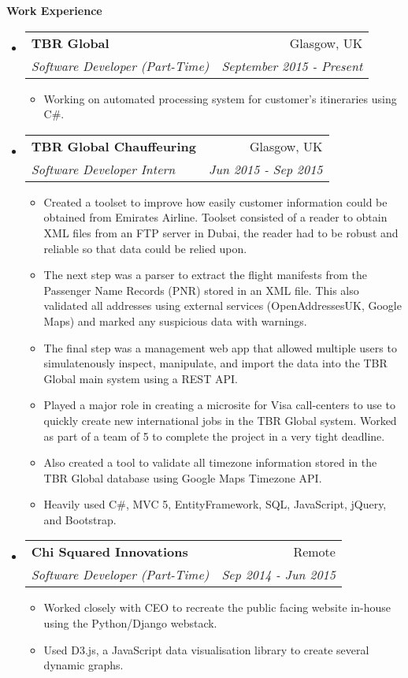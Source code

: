 \documentclass[letterpaper,11pt]{article}
\makeatletter
\newcommand{\resitem}[1]{\item #1 \vspace{-2pt}}
\newcommand{\resheading}[1]{{\large \colorbox{mygrey}{\begin{minipage}{\textwidth}{\textbf{#1 \vphantom{p\^{E}}}}\end{minipage}}}}
\newcommand{\ressubheading}[4]{
\begin{tabular*}{7.0in}{l@{\extracolsep{\fill}}r}
		\textbf{#1} & #2 \\
		\textit{#3} & \textit{#4} \\
\end{tabular*}\vspace{-6pt}}
\makeatother
\begin{document}
\resheading{Work Experience}
\begin{itemize}
\item
	\ressubheading{TBR Global}{Glasgow, UK}{Software Developer (Part-Time)}{September 2015 - Present}
	\begin{itemize}
		\resitem{Working on automated processing system for customer's itineraries using C\#.}
	\end{itemize}

\item
	\ressubheading{TBR Global Chauffeuring}{Glasgow, UK}{Software Developer Intern}{Jun 2015 - Sep 2015}
	\begin{itemize}
		\resitem{Created a toolset to improve how easily customer information could be obtained from Emirates Airline.
		Toolset consisted of a reader to obtain XML files from an FTP server in Dubai, the reader had to be robust and
		reliable so that data could be relied upon.}
		\resitem {The next step was a parser to extract the flight manifests from the Passenger Name Records (PNR) stored
		in an XML file. This also validated all addresses using external services (OpenAddressesUK, Google Maps) and marked
		any suspicious data with warnings.}
		\resitem {The final step was a management web app that allowed multiple users to simulatenously inspect, manipulate,
		and import the data into the TBR Global main system using a REST API.}
		\resitem {Played a major role in creating a microsite for Visa call-centers to use to quickly create new international
		jobs in the TBR Global system. Worked as part of a team of 5 to complete the project in a very tight deadline.}
		\resitem {Also created a tool to validate all timezone information stored in the TBR Global database using Google
		Maps Timezone API.}
		\resitem {Heavily used C\#, MVC 5, EntityFramework, SQL, JavaScript, jQuery, and Bootstrap.}
	\end{itemize}

\item
	\ressubheading{Chi Squared Innovations}{Remote}{Software Developer (Part-Time)}{Sep 2014 - Jun 2015}
	\begin{itemize}
		\resitem {Worked closely with CEO to recreate the public facing website in-house using the Python/Django webstack.}
		\resitem {Used D3.js, a JavaScript data visualisation library to create several dynamic graphs.}
	\end{itemize}

\end{itemize}

\pagebreak
\end{document}
